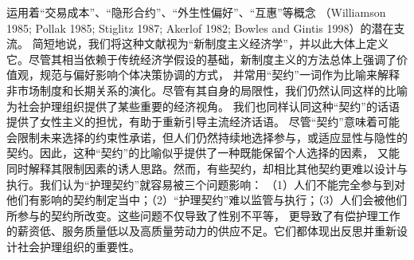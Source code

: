 \documentclass[UTF8]{ctexart}
\begin{document}
运用着“交易成本”、“隐形合约”、“外生性偏好”、“互惠”等概念
（Williamson 1985; Pollak 1985; Stiglitz 1987; Akerlof 1982; Bowles and Gintis 1998）的潜在支流。
简短地说，我们将这种文献视为“新制度主义经济学”，并以此大体上定义它。尽管其相当依赖于传统经济学假设的基础，新制度主义的方法总体上强调了价值观，规范与偏好影响个体决策协调的方式，
并常用“契约”一词作为比喻来解释非市场制度和长期关系的演化。尽管有其自身的局限性，我们仍然认同这样的比喻为社会护理组织提供了某些重要的经济视角。
我们也同样认同这种“契约”的话语提供了女性主义的担忧，有助于重新引导主流经济话语。
尽管“契约”意味着可能会限制未来选择的约束性承诺，但人们仍然持续地选择参与，或适应显性与隐性的契约。因此，这种“契约”的比喻似乎提供了一种既能保留个人选择的因素，
又能同时解释其限制因素的诱人思路。然而，有些契约，却相比其他契约更难以设计与执行。我们认为“护理契约”就容易被三个问题影响：
（1）人们不能完全参与到对他们有影响的契约制定当中；（2）“护理契约”难以监管与执行；（3）人们会被他们所参与的契约所改变。这些问题不仅导致了性别不平等，
更导致了有偿护理工作的薪资低、服务质量低以及高质量劳动力的供应不足。它们都体现出反思并重新设计社会护理组织的重要性。
\end{document}
